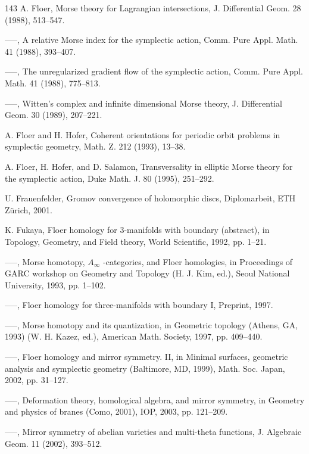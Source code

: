 \begin{thebibliography}{143}
 A. Floer, Morse theory for Lagrangian intersections, J. Differential Geom. 28 (1988), 513–547.

 —–, A relative Morse index for the symplectic action, Comm. Pure Appl. Math. 41 (1988), 393–407.

 —–, The unregularized gradient flow of the symplectic action, Comm. Pure Appl. Math. 41 (1988), 775–813.

 —–, Witten’s complex and infinite dimensional Morse theory, J. Differential Geom. 30 (1989), 207–221.

 A. Floer and H. Hofer, Coherent orientations for periodic orbit problems in symplectic geometry, Math. Z. 212 (1993), 13–38.

 A. Floer, H. Hofer, and D. Salamon, Transversality in elliptic Morse theory for the symplectic action, Duke Math. J. 80 (1995), 251–292.

 U. Frauenfelder, Gromov convergence of holomorphic discs, Diplomarbeit, ETH Zürich, 2001.

 K. Fukaya, Floer homology for 3-manifolds with boundary (abstract), in Topology, Geometry, and Field theory, World Scientific, 1992, pp. 1–21.

 —–, Morse homotopy, \ensuremath{A_\infty} -categories, and Floer homologies, in Proceedings of GARC workshop on Geometry and Topology (H. J. Kim, ed.), Seoul National University, 1993, pp. 1–102.

 —–, Floer homology for three-manifolds with boundary I, Preprint, 1997.

 —–, Morse homotopy and its quantization, in Geometric topology (Athens, GA, 1993) (W. H. Kazez, ed.), American Math. Society, 1997, pp. 409–440.

 —–, Floer homology and mirror symmetry. II, in Minimal surfaces, geometric analysis and symplectic geometry (Baltimore, MD, 1999), Math. Soc. Japan, 2002, pp. 31–127.

 —–, Deformation theory, homological algebra, and mirror symmetry, in Geometry and physics of branes (Como, 2001), IOP, 2003, pp. 121–209.

 —–, Mirror symmetry of abelian varieties and multi-theta functions, J. Algebraic Geom. 11 (2002), 393–512.


\end{thebibliography}
